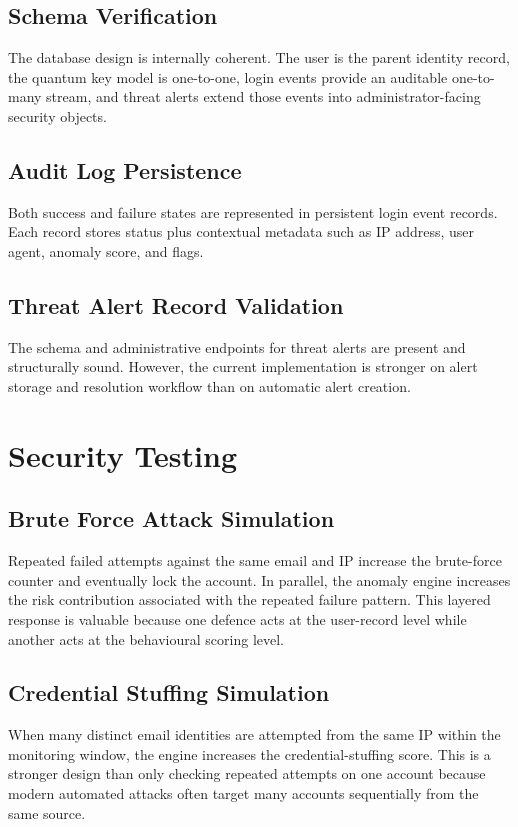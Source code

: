\documentclass[12pt,a4paper]{report}
\begin{document}
\subsection{Schema Verification}
The database design is internally coherent. The user is the parent identity record, the quantum key model is one-to-one, login events provide an auditable one-to-many stream, and threat alerts extend those events into administrator-facing security objects.

\subsection{Audit Log Persistence}
Both success and failure states are represented in persistent login event records. Each record stores status plus contextual metadata such as IP address, user agent, anomaly score, and flags.

\subsection{Threat Alert Record Validation}
The schema and administrative endpoints for threat alerts are present and structurally sound. However, the current implementation is stronger on alert storage and resolution workflow than on automatic alert creation.

\section{Security Testing}

\subsection{Brute Force Attack Simulation}
Repeated failed attempts against the same email and IP increase the brute-force counter and eventually lock the account. In parallel, the anomaly engine increases the risk contribution associated with the repeated failure pattern. This layered response is valuable because one defence acts at the user-record level while another acts at the behavioural scoring level.

\subsection{Credential Stuffing Simulation}
When many distinct email identities are attempted from the same IP within the monitoring window, the engine increases the credential-stuffing score. This is a stronger design than only checking repeated attempts on one account because modern automated attacks often target many accounts sequentially from the same source.
\end{document}
